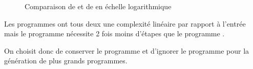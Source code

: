 \documentclass[a4paper, 11pt]{article}
\begin{document}
\begin{enumerate}
    \begin{minipage}{\linewidth}
    \begin{figure}[H]
                
            \begin{center}
                
            \end{center}
            \caption{Comparaison de \protect{} et de \protect{} en échelle logarithmique}
    \end{figure}
    
\end{minipage}

Les programmes ont tous deux une complexité linéaire par rapport à l'entrée mais le programme
 nécessite 2 fois moins d'étapes que le programme .

On choisit donc de conserver le programme  et d'ignorer le programme  pour
la génération de plus grands programmes.


\end{enumerate}
\end{document}

